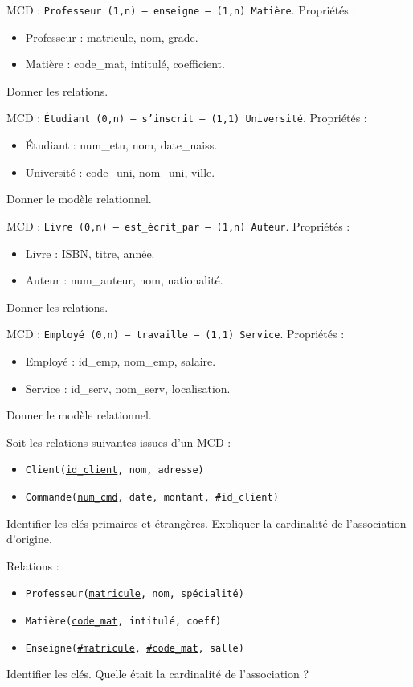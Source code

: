 \exo{}
MCD : \texttt{Professeur (1,n) --- enseigne --- (1,n) Matière}. Propriétés :
\begin{itemize}
    \item Professeur : matricule, nom, grade.
    \item Matière : code\_mat, intitulé, coefficient.
\end{itemize}
Donner les relations.

\exo{}
MCD : \texttt{Étudiant (0,n) --- s'inscrit --- (1,1) Université}. Propriétés :
\begin{itemize}
    \item Étudiant : num\_etu, nom, date\_naiss.
    \item Université : code\_uni, nom\_uni, ville.
\end{itemize}
Donner le modèle relationnel.

\exo{}
MCD : \texttt{Livre (0,n) --- est\_écrit\_par --- (1,n) Auteur}. Propriétés :
\begin{itemize}
    \item Livre : ISBN, titre, année.
    \item Auteur : num\_auteur, nom, nationalité.
\end{itemize}
Donner les relations.

\exo{}
MCD : \texttt{Employé (0,n) --- travaille --- (1,1) Service}. Propriétés :
\begin{itemize}
    \item Employé : id\_emp, nom\_emp, salaire.
    \item Service : id\_serv, nom\_serv, localisation.
\end{itemize}
Donner le modèle relationnel.


\exo{}
Soit les relations suivantes issues d'un MCD :
\begin{itemize}
    \item \texttt{Client(\underline{id\_client}, nom, adresse)}
    \item \texttt{Commande(\underline{num\_cmd}, date, montant, \#id\_client)}
\end{itemize}
Identifier les clés primaires et étrangères. Expliquer la cardinalité de l'association d'origine.

\exo{}
Relations :
\begin{itemize}
    \item \texttt{Professeur(\underline{matricule}, nom, spécialité)}
    \item \texttt{Matière(\underline{code\_mat}, intitulé, coeff)}
    \item \texttt{Enseigne(\underline{\#matricule}, \underline{\#code\_mat}, salle)}
\end{itemize}
Identifier les clés. Quelle était la cardinalité de l'association ?

